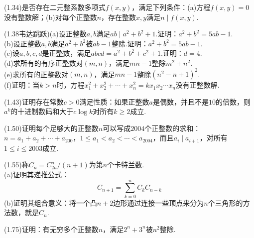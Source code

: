 \documentclass[cn,hazy,black,10pt,normal]{elegantnote}
\begin{document}
\newpage
\begin{problem}
	(1.34)是否存在二元整系数多项式$f(x,y)$，满足下列条件：(a)方程$f(x,y)=0$没有整数解；(b)对每个正整数$n$，存在整数$x,y$满足$n \mid f(x,y)$.
\end{problem}

\vspace{26em}

\begin{problem}
	(1.38韦达跳跃)(a)设正整数$a,b$满足$ab \mid a^2+b^2+1$.证明：$a^2+b^2=5ab-1$. \\
	(b)设正整数$a,b$满足$a^2+b^2$被$ab-1$整除.证明：$a^2+b^2=5ab-1$. \\
	(c)设$a,b,c,d$是正整数，满足$abcd=a^2+b^2+c^2+1$.证明：$d=4$. \\
	(d)求所有的有序正整数对$(m,n)$，满足$mn-1$整除$m^2+n^2$. \\
	(e)求所有的正整数对$(m,n)$，满足$mn-1$整除$(n^2-n+1)^2$. \\
	(f)证明：当$k>n$时，方程$x_1^2+x_2^2+\cdots + x_n^2=kx_1x_2\cdots x_n$没有正整数解.
\end{problem}

\newpage
\begin{problem}
	(1.43)证明存在常数$c>0$满足性质：如果正整数$a$是偶数，并且不是$10$的倍数，则$a^k$的十进制数码和大于$c \log k$对所有$k \geq 2$成立.
\end{problem}

\vspace{26em}

\begin{problem}
	(1.50)证明每个足够大的正整数$n$可以写成$2004$个正整数的求和：$n=a_1+a_2+\cdots +a_{200
	}$，$1 \leq a_1 < a_2 <\cdots < a_{2004}$，而且$a_i \mid a_{i+1}$，对所有$1 \leq i \leq 2003$成立.
\end{problem}

\newpage

\begin{problem}
	(1.55)称$C_n=C_{2n}^n / (n+1)$为第$n$个卡特兰数. \\
	(a)证明其递推公式：$$C_{n+1}=\sum_{k=0}^{n} C_kC_{n-k}$$
	(b)证明其组合意义：将一个凸$n+2$边形通过连接一些顶点来分为$n$个三角形的方法数，就是$C_n$.
\end{problem}

\vspace{26em}

\begin{problem}
	(1.75)证明：有无穷多个正整数$n$，满足$2^n+3^n$被$n^2$整除.
\end{problem}
\end{document}
